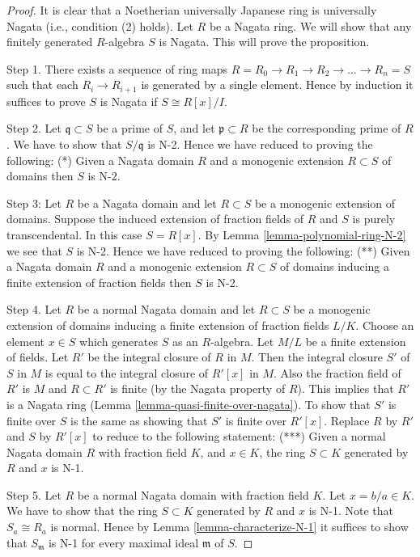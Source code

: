 \begin{proof}
It is clear that a Noetherian universally Japanese ring is universally
Nagata (i.e., condition (2) holds). Let $R$ be a Nagata ring.
We will show that any finitely generated $R$-algebra $S$ is Nagata.
This will prove the proposition.

\medskip\noindent
Step 1. There exists a sequence of ring maps
$R = R_0 \to R_1 \to R_2 \to \ldots \to R_n = S$ such that
each $R_i \to R_{i + 1}$ is generated by a single element.
Hence by induction it suffices to prove $S$ is Nagata if
$S \cong R[x]/I$.

\medskip\noindent
Step 2. Let $\mathfrak q \subset S$ be a prime of $S$, and let
$\mathfrak p \subset R$ be the corresponding prime of $R$.
We have to show that $S/\mathfrak q$ is N-2. Hence we have
reduced to proving the following:
(*) Given a Nagata domain $R$ and a monogenic extension $R \subset S$
of domains then $S$ is N-2.

\medskip\noindent
Step 3: Let $R$ be a Nagata domain and
let $R \subset S$ be a monogenic extension of domains.
Suppose the induced extension of fraction fields of $R$ and $S$
is purely transcendental. In this case $S = R[x]$. By
Lemma \ref{lemma-polynomial-ring-N-2} we see that $S$ is N-2.
Hence we have reduced to proving the following:
(**) Given a Nagata domain $R$ and a
monogenic extension $R \subset S$ of domains
inducing a finite extension of fraction fields
then $S$ is N-2.

\medskip\noindent
Step 4. Let $R$ be a normal Nagata domain and
let $R \subset S$ be a monogenic extension of domains
inducing a finite extension of fraction fields $L/K$.
Choose an element $x \in S$
which generates $S$ as an $R$-algebra. Let $M/L$
be a finite extension of fields.
Let $R'$ be the integral closure of $R$ in $M$.
Then the integral closure $S'$ of $S$ in $M$ is equal to the integral
closure of $R'[x]$ in $M$.
Also the fraction field of $R'$ is $M$ and $R \subset R'$
is finite (by the Nagata property of $R$).
This implies that $R'$ is a Nagata ring
(Lemma \ref{lemma-quasi-finite-over-nagata}).
To show that $S'$ is finite over $S$ is the same as showing that
$S'$ is finite over $R'[x]$. Replace $R$ by $R'$ and $S$ by $R'[x]$
to reduce to the following statement:
(***) Given a normal Nagata domain $R$ with fraction field $K$,
and $x \in K$, the ring $S \subset K$ generated by $R$ and $x$
is N-1.

\medskip\noindent
Step 5. Let $R$ be a normal Nagata domain with fraction field $K$.
Let $x = b/a \in K$. We have to show that the ring $S \subset K$
generated by $R$ and $x$ is N-1. Note that $S_a \cong R_a$ is normal.
Hence by Lemma \ref{lemma-characterize-N-1} it suffices to show that
$S_{\mathfrak m}$ is N-1 for every maximal ideal $\mathfrak m$ of $S$.


\end{proof}

